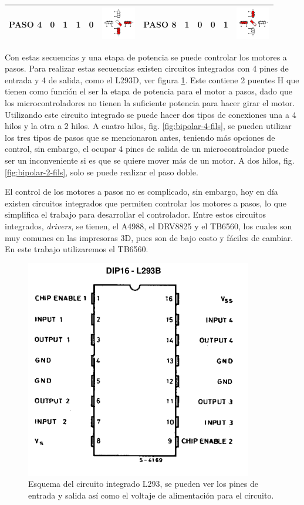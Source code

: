 \begin{table}
\begin{tabular}{|c|c|c|c|c|c|c|c|c|c|c|c|}
		\hline 
		PASO 4 & 0 & 1 & 1 & 0 & \includegraphics[width=15mm]{Imagenes/2/paso2_5} &	PASO 8  & 1 & 0 & 0 & 1 & \includegraphics[width=15mm]{Imagenes/2/paso4_5} \\ 
		\hline 
	\end{tabular} 
\end{table}

Con estas secuencias y una etapa de potencia se puede controlar los motores a pasos. Para realizar estas secuencias existen circuitos integrados con 4 pines de entrada y 4 de salida, como el L293D, ver figura \ref{fig:l293}. Este contiene 2 puentes H que tienen como función el ser la etapa de potencia para el motor a pasos, dado que los microcontroladores no tienen la suficiente potencia para hacer girar el motor.
Utilizando este circuito integrado se puede hacer dos tipos de conexiones una a 4 hilos y la otra a 2 hilos. A cuatro hilos, fig. \ref{fig:bipolar-4-fils}, se pueden utilizar los tres tipos de pasos que se mencionaron antes, teniendo más opciones de control, sin embargo, el ocupar 4 pines de salida de un microcontrolador puede ser un inconveniente si es que se quiere mover más de un motor. A dos hilos, fig. \ref{fig:bipolar-2-fils}, solo se puede realizar el paso doble. %

El control de los motores a pasos no es complicado, sin embargo, hoy en día existen circuitos integrados que permiten controlar los motores a pasos, lo que simplifica el trabajo para desarrollar el controlador. Entre estos circuitos integrados, \textit{drivers}, se tienen, el A4988, el DRV8825 y el TB6560, los cuales son muy comunes en las impresoras 3D, pues son de bajo costo y fáciles de cambiar. En este trabajo utilizaremos el TB6560.
\begin{figure}[h]
	\centering
	\includegraphics[width=0.4\linewidth]{Imagenes/2/L293}
	\caption[Esquema del circuito integrado L293]{Esquema del circuito integrado L293, se pueden ver los pines de entrada y salida así como el voltaje de alimentación para el circuito. \cite{L2931986}}
	\label{fig:l293}
\end{figure}

